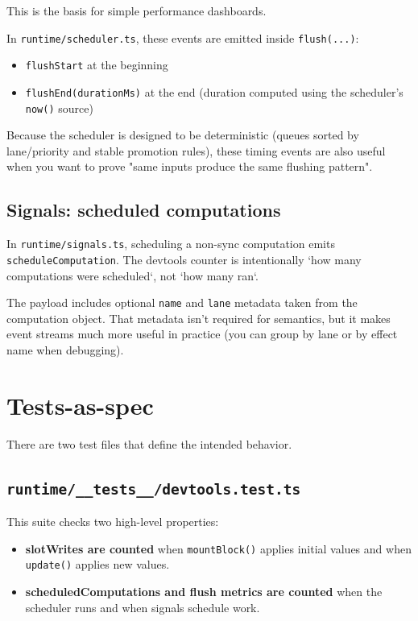 This is the basis for simple performance dashboards.

In \texttt{runtime/scheduler.ts}, these events are emitted inside \texttt{flush(...)}:

\begin{itemize}
\item \texttt{flushStart} at the beginning
\item \texttt{flushEnd(durationMs)} at the end (duration computed using the scheduler's \texttt{now()} source)
\end{itemize}

Because the scheduler is designed to be deterministic (queues sorted by lane/priority and stable promotion rules), these timing events are also useful when you want to prove "same inputs produce the same flushing pattern".

\subsection{Signals: scheduled computations}

In \texttt{runtime/signals.ts}, scheduling a non-sync computation emits \texttt{scheduleComputation}.
The devtools counter is intentionally `how many computations were scheduled`, not `how many ran`.

The payload includes optional \texttt{name} and \texttt{lane} metadata taken from the computation object. That metadata isn't required for semantics, but it makes event streams much more useful in practice (you can group by lane or by effect name when debugging).

\section{Tests-as-spec}

There are two test files that define the intended behavior.

\subsection{\texttt{runtime/\_\_tests\_\_/devtools.test.ts}}

This suite checks two high-level properties:

\begin{itemize}
\item \textbf{slotWrites are counted} when \texttt{mountBlock()} applies initial values and when \texttt{update()} applies new values.
\item \textbf{scheduledComputations and flush metrics are counted} when the scheduler runs and when signals schedule work.
\end{itemize}


